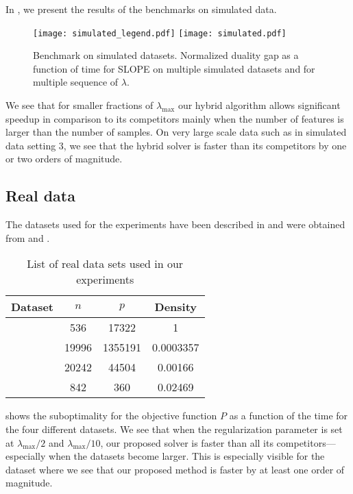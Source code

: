 In , we present the results of the benchmarks on simulated data.

\begin{figure*}[!t]
  \centering
  \texttt{[image: simulated\_legend.pdf]}
  \texttt{[image: simulated.pdf]}
  \caption{Benchmark on simulated datasets. Normalized duality gap as a function of time for SLOPE on multiple simulated datasets and for multiple sequence of $\lambda$.}
  \label{fig:simulated}
\end{figure*}

We see that for smaller fractions of $\lambda_{\text{max}}$ our hybrid algorithm allows significant speedup in comparison to its competitors mainly when the number of features is larger than the number of samples.
On very large scale data such as in simulated data setting $3$, we see that the hybrid solver is faster than its competitors by one or two orders of magnitude.

\subsection{Real data}
\label{sec:experiments-real-data}

The datasets used for the experiments have been described in  and were obtained from \textcite{chang2011,chang2016} and \textcite{breheny2022}.

\begin{table}[hbt]
  \centering
  \caption{List of real data sets used in our experiments}
  \label{tab:real-data}
  \begin{tabular}{
      l
      S[table-format=5.0,round-mode=off]
      S[table-format=7.0,round-mode=off]
      S[table-format=1.5,round-mode=figures,round-precision=2]
    }
    \toprule
    Dataset            & {\(n\)} & {\(p\)} & {Density} \\ \midrule
       & 536     & 17322   & 1         \\
       & 19996   & 1355191 & 0.0003357 \\
         & 20242   & 44504   & 0.00166   \\
     & 842     & 360     & 0.02469   \\ \bottomrule
  \end{tabular}
\end{table}

 shows the suboptimality for the objective function $P$ as a function of the time for the four different datasets.
We see that when the regularization parameter is set at $\lambda_{\text{max}}/2$ and $\lambda_{\text{max}}/10$, our proposed solver is faster than all its competitors---especially when the datasets become larger.
This is especially visible for the  dataset where we see that our proposed method is faster by at least one order of magnitude.

